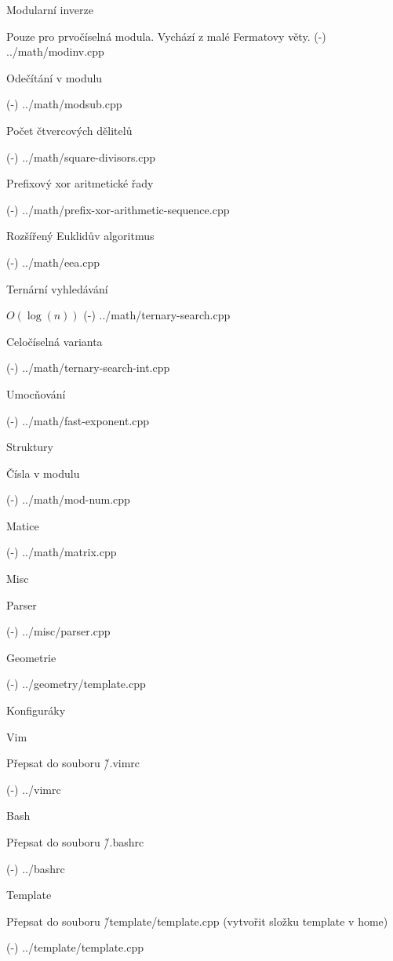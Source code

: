 \sec Modularní inverze 

Pouze pro prvočíselná modula. Vychází z malé Fermatovy věty.
\verbinput (-) ../math/modinv.cpp

\sec Odečítání v modulu 

\verbinput (-) ../math/modsub.cpp

\sec Počet čtvercových dělitelů 

\verbinput (-) ../math/square-divisors.cpp

\sec Prefixový xor aritmetické řady 

\verbinput (-) ../math/prefix-xor-arithmetic-sequence.cpp

\sec Rozšířený Euklidův algoritmus 

\verbinput (-) ../math/eea.cpp

\sec Ternární vyhledávání 

$O(\log(n))$
\verbinput (-) ../math/ternary-search.cpp

\secc Celočíselná varianta

\verbinput (-) ../math/ternary-search-int.cpp

\sec Umocňování 

\verbinput (-) ../math/fast-exponent.cpp

\sec Struktury 

\secc Čísla v modulu 

\verbinput (-) ../math/mod-num.cpp

\secc Matice 

\verbinput (-) ../math/matrix.cpp

\newpage

\chap Misc

\sec Parser 

\verbinput (-) ../misc/parser.cpp

\newpage

\chap Geometrie

\verbinput (-) ../geometry/template.cpp

\newpage

\chap Konfiguráky

\sec Vim 

Přepsat do souboru \~/.vimrc

\verbinput (-) ../vimrc

\sec Bash 

Přepsat do souboru \~/.bashrc

\verbinput (-) ../bashrc

\sec Template 

Přepsat do souboru \~/template/template.cpp
(vytvořit složku template v home)

\verbinput (-) ../template/template.cpp

\bye
